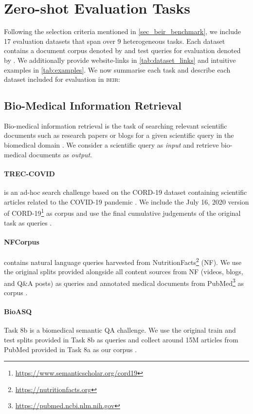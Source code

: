 \documentclass[11pt]{article}
\newcommand{\custo}[1]{\textsc{\normalsize #1}}
\newcommand{\beir}{\custo{beir}\xspace}
\begin{document}
\section{Zero-shot Evaluation Tasks}\label{sec:datasets}

Following the selection criteria mentioned in \autoref{sec_beir_benchmark}, we include 17 evaluation datasets that span over 9 heterogeneous tasks. Each dataset contains a document corpus denoted by  and test queries for evaluation denoted by . We additionally provide website-links in \autoref{tab:dataset_links} and intuitive examples in \autoref{tab:examples}. We now summarise each task and describe each dataset included for evaluation in \beir:


\subsection{Bio-Medical Information Retrieval}
Bio-medical information retrieval is the task of searching relevant scientific documents such as research papers or blogs for a given scientific query in the biomedical domain \cite{jiang2007empirical}. We consider a scientific query as \textit{input} and retrieve bio-medical documents as \textit{output}.

\paragraph{TREC-COVID} \cite{10.1145/3451964.3451965} is an ad-hoc search challenge based on the CORD-19 dataset containing scientific articles related to the COVID-19 pandemic \cite{wang2020cord19}. We include the July 16, 2020 version of CORD-19\footnote{\href{https://www.semanticscholar.org/cord19}{https://www.semanticscholar.org/cord19}} as corpus  and use the final cumulative judgements of the original task as queries .

\paragraph{NFCorpus} \cite{boteva2016} contains natural language queries harvested from NutritionFacts\footnote{\href{https://nutritionfacts.org}{https://nutritionfacts.org}} (NF). We use the original splits provided alongside all content sources from NF (videos, blogs, and Q\&A posts) as queries  and annotated medical documents from PubMed\footnote{\href{https://pubmed.ncbi.nlm.nih.gov}{https://pubmed.ncbi.nlm.nih.gov}} as corpus .

\paragraph{BioASQ}\cite{tsatsaronis2015overview} Task 8b is a biomedical semantic QA challenge. We use the original train and test splits provided in Task 8b as queries  and collect around 15M articles from PubMed provided in Task 8a as our corpus . 
\end{document}
